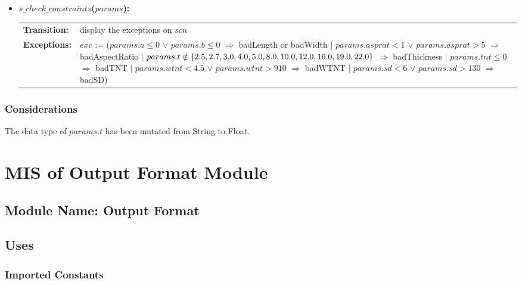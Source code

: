 \documentclass[12pt]{article}
\begin{document}
\begin{itemize}
\item\textbf{$s\_check\_constraints$($params$):}  \\ \newline
\begin{tabular}{l p{}}
\textbf{Transition:} & display the exceptions on $scn$\\
\textbf{Exceptions:} & $exc$ := \newline ($params.a \leq 0$ $\vee$ $params.b \leq 0$ $\Rightarrow$ badLength or badWidth 
\newline $|$ $params.asprat < 1$ $\vee$ $params.asprat > 5$ $\Rightarrow$ badAspectRatio \newline 
$|$ $params.t \notin \{2.5, 2.7, 3.0, 4.0, 5.0, 8.0, 10.0, 12.0, 16.0,\newline 19.0, 22.0\}$ $\Rightarrow$ badThickness
\newline $|$ $params.tnt \leq 0$ $\Rightarrow$ badTNT \newline
$|$ $params.wtnt < 4.5$ $\vee$ $params.wtnt > 910$ $\Rightarrow$ badWTNT \newline
$|$ $params.sd < 6$ $\vee$ $params.sd > 130$ $\Rightarrow$ badSD)\\
\end{tabular}
\end{itemize}

\subsubsection{Considerations}

The data type of $params.t$ has been mutated from String to Float.


\section{MIS of Output Format Module} \label{SecOutF}

\subsection{Module Name: Output Format}

\subsection{Uses}

\subsubsection{Imported Constants}
\end{document}
